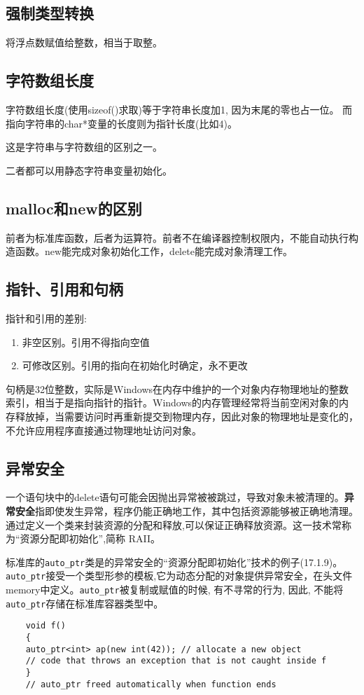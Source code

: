 \subsection{强制类型转换}
将浮点数赋值给整数，相当于取整。

\subsection{字符数组长度}
字符数组长度(使用sizeof()求取)等于字符串长度加1, 因为末尾的零也占一位。
而指向字符串的char*变量的长度则为指针长度(比如4)。

这是字符串与字符数组的区别之一。

二者都可以用静态字符串变量初始化。

\subsection{malloc和new的区别}
前者为标准库函数，后者为运算符。前者不在编译器控制权限内，不能自动执行构造函数。new能完成对象初始化工作，delete能完成对象清理工作。

\subsection{指针、引用和句柄}
指针和引用的差别:
\begin{enumerate}
    \item 非空区别。引用不得指向空值
    \item 可修改区别。引用的指向在初始化时确定，永不更改
\end{enumerate}

句柄是32位整数，实际是Windows在内存中维护的一个对象内存物理地址的整数索引，相当于是指向指针的指针。Windows的内存管理经常将当前空闲对象的内存释放掉，当需要访问时再重新提交到物理内存，因此对象的物理地址是变化的，不允许应用程序直接通过物理地址访问对象。

\subsection{异常安全}
一个语句块中的delete语句可能会因抛出异常被被跳过，导致对象未被清理的。\textbf{异常安全}指即使发生异常，程序仍能正确地工作，其中包括资源能够被正确地清理。通过定义一个类来封装资源的分配和释放,可以保证正确释放资源。这一技术常称为“资源分配即初始化”,简称 RAII。

标准库的\verb|auto_ptr|类是的异常安全的“资源分配即初始化”技术的例子(\cite{cppprimer}17.1.9)。\verb|auto_ptr|接受一个类型形参的模板,它为动态分配的对象提供异常安全，在头文件memory中定义。\verb|auto_ptr|被复制或赋值的时候, 有不寻常的行为, 因此, 不能将\verb|auto_ptr|存储在标准库容器类型中。

\begin{lstlisting}
    void f()
    {
	auto_ptr<int> ap(new int(42)); // allocate a new object
	// code that throws an exception that is not caught inside f
    }
    // auto_ptr freed automatically when function ends
\end{lstlisting}



















